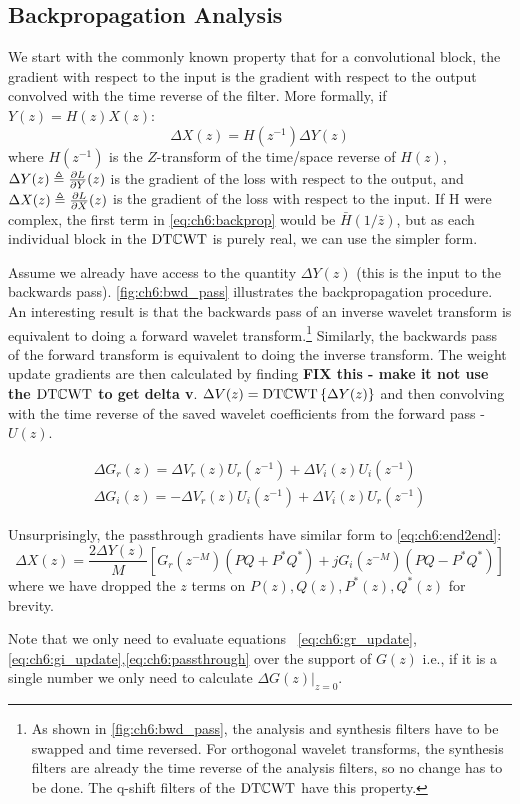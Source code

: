 \subsection{Backpropagation Analysis}
We start with the commonly known property that for a convolutional block, the
gradient with respect to the input is the gradient with respect to the output
convolved with the time reverse of the filter. More formally, if 
$Y(z) = H(z) X(z)$:
%
\begin{equation}\label{eq:ch6:backprop}
  \Delta X(z) = H(z^{-1}) \Delta Y(z)
\end{equation}
%
where $H(z^{-1})$ is the $Z$-transform of the time/space reverse of $H(z)$,
$\Delta Y(z) \triangleq \frac{\partial L}{\partial Y}(z)$ is the gradient of the loss with respect
to the output, and $\Delta X(z) \triangleq \frac{\partial L}{\partial X}(z)$ is the gradient of
the loss with respect to the input. If H were complex, the first term in
\autoref{eq:ch6:backprop} would be $\bar{H}(1/\bar{z})$, but as each individual
block in the $\mathrm{DT}\mathbb{C}\mathrm{WT}$ is purely real, we can use the simpler form. 

Assume we already have access to the quantity $\Delta Y(z)$ (this is the input
to the backwards pass). \autoref{fig:ch6:bwd_pass} illustrates the
backpropagation procedure. An interesting result is that the backwards pass of
an inverse wavelet transform is equivalent to doing a forward wavelet
transform.\footnote{As shown in \autoref{fig:ch6:bwd_pass}, the analysis and
synthesis filters have to be swapped and time reversed. For orthogonal wavelet
transforms, the synthesis filters are already the time reverse of the analysis
filters, so no change has to be done. The q-shift filters of the $\mathrm{DT}\mathbb{C}\mathrm{WT}$
\cite{kingsbury_design_2003} have this property.} Similarly, the backwards pass
of the forward transform is equivalent to doing the inverse transform. The
weight update gradients are then calculated by finding 
\textbf{FIX this - make it not use the $\mathrm{DT}\mathbb{C}\mathrm{WT}$ to get delta v}.
$\Delta V(z) = \mathrm{DT}\mathbb{C}\mathrm{WT}\left\{ \Delta Y(z) \right\}$ and then convolving with the 
time reverse of the saved wavelet coefficients from the forward pass - $U(z)$.

\begin{gather}
  \Delta G_r(z) = \Delta V_r(z) U_r(z^{-1}) + \Delta V_i(z) U_i(z^{-1})  \label{eq:ch6:gr_update}\\
  \Delta G_i(z) =  -\Delta V_r(z) U_i(z^{-1}) + \Delta V_i(z) U_r(z^{-1})  \label{eq:ch6:gi_update} 
\end{gather}

Unsurprisingly, the passthrough gradients have similar form to
\autoref{eq:ch6:end2end}:
\begin{equation}\label{eq:ch6:passthrough}
    \Delta X(z) = \frac{2\Delta Y(z)}{M} \left[G_r(z^{-M})\left( PQ + P^*Q^* \right)\right. + 
      \left. jG_i(z^{-M}) \left(PQ-P^*Q^* \right) \right] 
\end{equation}
where we have dropped the $z$ terms on $P(z), Q(z), P^*(z), Q^*(z)$ for brevity.

Note that we only need to evaluate equations
~\ref{eq:ch6:gr_update},\ref{eq:ch6:gi_update},\ref{eq:ch6:passthrough} over the
support of $G(z)$ i.e., if it is a single number we only need to calculate
$\left.\Delta G(z)\right\rvert_{z=0}$.



